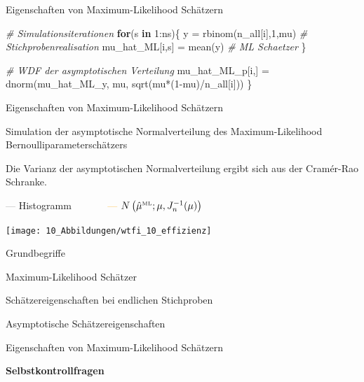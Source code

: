 \documentclass[
  8pt,
  ignorenonframetext,
]{beamer}
\newenvironment{Shaded}{\begin{snugshade}}{\end{snugshade}}
\newcommand{\CommentTok}[1]{\textcolor[rgb]{0.56,0.35,0.01}{\textit{#1}}}
\newcommand{\ControlFlowTok}[1]{\textcolor[rgb]{0.13,0.29,0.53}{\textbf{#1}}}
\newcommand{\DecValTok}[1]{\textcolor[rgb]{0.00,0.00,0.81}{#1}}
\newcommand{\FunctionTok}[1]{\textcolor[rgb]{0.00,0.00,0.00}{#1}}
\newcommand{\NormalTok}[1]{#1}
\newcommand{\OtherTok}[1]{\textcolor[rgb]{0.56,0.35,0.01}{#1}}
\newcommand{\SpecialCharTok}[1]{\textcolor[rgb]{0.00,0.00,0.00}{#1}}
\begin{document}
\begin{frame}[fragile]{Eigenschaften von Maximum-Likelihood Schätzern}
\begin{Shaded}
\begin{Highlighting}[]
    \CommentTok{\# Simulationsiterationen}
    \ControlFlowTok{for}\NormalTok{(s }\ControlFlowTok{in} \DecValTok{1}\SpecialCharTok{:}\NormalTok{ns)\{}
\NormalTok{        y               }\OtherTok{=} \FunctionTok{rbinom}\NormalTok{(n\_all[i],}\DecValTok{1}\NormalTok{,mu)             }\CommentTok{\# Stichprobenrealisation}
\NormalTok{        mu\_hat\_ML[i,s]  }\OtherTok{=} \FunctionTok{mean}\NormalTok{(y)                           }\CommentTok{\# ML Schaetzer}
\NormalTok{    \}}

    \CommentTok{\# WDF der asymptotischen Verteilung}
\NormalTok{    mu\_hat\_ML\_p[i,] }\OtherTok{=} \FunctionTok{dnorm}\NormalTok{(mu\_hat\_ML\_y, mu, }\FunctionTok{sqrt}\NormalTok{(mu}\SpecialCharTok{*}\NormalTok{(}\DecValTok{1}\SpecialCharTok{{-}}\NormalTok{mu)}\SpecialCharTok{/}\NormalTok{n\_all[i]))}
\NormalTok{\}}
\end{Highlighting}
\end{Shaded}
\end{frame}

\begin{frame}{Eigenschaften von Maximum-Likelihood Schätzern}
\protect\hypertarget{eigenschaften-von-maximum-likelihood-schuxe4tzern-2}{}
\small

Simulation der asymptotische Normalverteilung des Maximum-Likelihood
Bernoulliparameterschätzers

\footnotesize

Die Varianz der asymptotischen Normalverteilung ergibt sich aus der
Cramér-Rao Schranke.

\footnotesize
\center
\vspace{10mm}

\textcolor{gray}{---} Histogramm \(\quad\quad\quad\)
\textcolor{orange}{---}
\(N\left(\hat{\mu}^{\tiny \mbox{ML}}; \mu, J_n^{-1}(\mu)\right)\)

\begin{center}\texttt{[image: 10\_Abbildungen/wtfi\_10\_effizienz]} \end{center}
\end{frame}

\begin{frame}{}
\protect\hypertarget{section-12}{}
\large
\vfill
{}

Grundbegriffe

Maximum-Likelihood Schätzer

Schätzereigenschaften bei endlichen Stichproben

Asymptotische Schätzereigenschaften

Eigenschaften von Maximum-Likelihood Schätzern

\textbf{Selbstkontrollfragen} \vfill
\end{frame}
\end{document}
